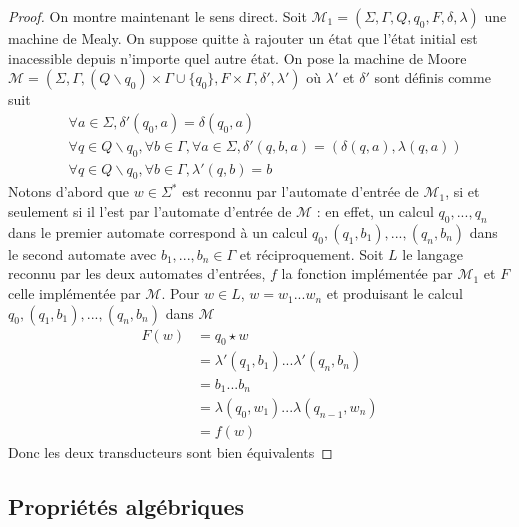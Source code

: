 \documentclass{scrartcl}
\begin{document}
\begin{flushleft}
\begin{proof}
    \vspace*{1cm}
    On montre maintenant le sens direct. Soit $\mathcal{M}_1 = (\Sigma, \Gamma, Q, q_0, F, \delta, \lambda)$ une machine de Mealy.
    On suppose quitte à rajouter un état que l'état initial est inacessible depuis n'importe quel autre état. On pose la machine de Moore
    $\mathcal{M} = (\Sigma, \Gamma, (Q \backslash q_0) \times \Gamma \cup \{q_0\}, F \times \Gamma, \delta', \lambda')$ où
    $\lambda'$ et $\delta'$ sont définis comme suit
    \begin{equation*}
        \begin{split}
            &\forall a \in \Sigma, \delta'(q_0, a) = \delta(q_0, a)\\
            &\forall q \in Q \backslash q_0, \forall b \in \Gamma, \forall a \in \Sigma, \delta'(q, b, a) = (\delta(q, a), \lambda(q, a))\\
            &\forall q \in Q \backslash q_0, \forall b \in \Gamma, \lambda'(q, b) = b
        \end{split}
    \end{equation*}
    Notons d'abord que $w \in \Sigma^*$ est reconnu par l'automate d'entrée de $\mathcal{M}_1$, si et seulement si il l'est par l'automate d'entrée de 
    $\mathcal{M}$ : en effet, un calcul $q_0, ..., q_n$ dans le premier automate correspond à un calcul $q_0, (q_1, b_1), ..., (q_n, b_n)$
    dans le second automate avec $b_1, ..., b_n \in \Gamma$ et réciproquement. Soit $L$ le langage reconnu par les deux automates d'entrées,
    $f$ la fonction implémentée par $\mathcal{M}_1$ et $F$ celle implémentée par $\mathcal{M}$. Pour $w \in L$, $w = w_1 ... w_n$
    et produisant le calcul $q_0, (q_1, b_1), ..., (q_n, b_n)$ dans $\mathcal{M}$
    \begin{align*}
        F(w) &= q_0 \star w\\
        &= \lambda'(q_1, b_1) ... \lambda'(q_n, b_n)\\
        &= b_1 ... b_n\\
        &= \lambda(q_0, w_1) ... \lambda(q_{n-1}, w_n)\\
        &= f(w)
    \end{align*}
    Donc les deux transducteurs sont bien équivalents

\end{proof}

\subsection{Propriétés algébriques}


\end{flushleft}
\end{document}
